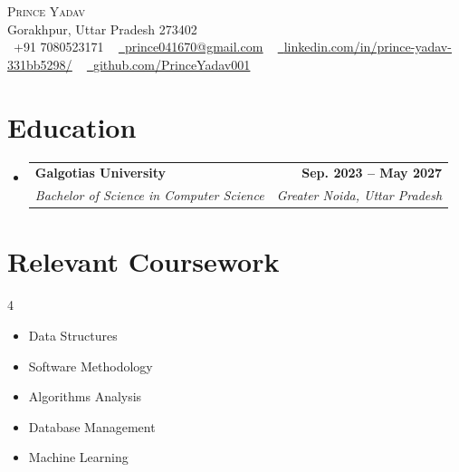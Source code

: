 \documentclass[letterpaper,11pt]{article}
\makeatletter
\newcommand{\resumeSubheading}[4]{
  \vspace{-2pt}\item
    \begin{tabular*}{1.0\textwidth}[t]{l@{\extracolsep{\fill}}r}
      \textbf{#1} & \textbf{\small #2} \\
      \textit{\small#3} & \textit{\small #4} \\
    \end{tabular*}\vspace{-7pt}
}
\newcommand{\resumeSubHeadingListStart}{\begin{itemize}[leftmargin=0.0in, label={}]}
\newcommand{\resumeSubHeadingListEnd}{\end{itemize}}
\makeatother
\begin{document}
\begin{center}
    {\Huge \scshape Prince Yadav} \\ \vspace{1pt}
    Gorakhpur, Uttar Pradesh 273402 \\ \vspace{1pt}
    \small \raisebox{-0.1\height}\faPhone\ +91 7080523171 ~ \href{mailto:prince041670@gmail.com}{\raisebox{-0.2\height}\faEnvelope\  \underline{prince041670@gmail.com}} ~ 
    \href{https://linkedin.com/in/prince-yadav-331bb5298/}{\raisebox{-0.2\height}\faLinkedin\ \underline{linkedin.com/in/prince-yadav-331bb5298/}}  ~
    \href{https://github.com/PrinceYadav001}{\raisebox{-0.2\height}\faGithub\ \underline{github.com/PrinceYadav001}}
    \vspace{-8pt}
\end{center}

\section{Education}
  \resumeSubHeadingListStart
    \resumeSubheading
      {Galgotias University}{Sep. 2023 -- May 2027}
      {Bachelor of Science in Computer Science}{Greater Noida, Uttar Pradesh}
  \resumeSubHeadingListEnd

\section{Relevant Coursework}
        \begin{multicols}{4}
            \begin{itemize}[itemsep=-5pt, parsep=3pt]
                \item\small Data Structures
                \item Software Methodology
                \item Algorithms Analysis
                \item Database Management
                \item Machine Learning
            \end{itemize}
        \end{multicols}
        \vspace*{2.0\multicolsep}

\end{document}
